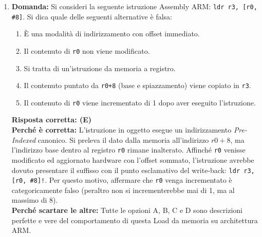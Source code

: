 \documentclass[12pt, a4paper]{article}
\begin{document}
\begin{enumerate}
\newpage
    
    \textbf{Risposta corretta: (D)} \\
    \textbf{Perché è corretta:} Per progettare una macchina a stati \textit{sincrona} (che aggiorna il suo stato interno solo a passi temporali rigidamente scanditi) è fisicamente obbligatorio utilizzare elementi sensibili unicamente al \textbf{fronte} del clock (Edge-triggered Flip-Flops). Un Latch D puro è invece trasparente "a livello": se il segnale di abilitazione resta alto, un feedback combinatorio farebbe ruzzolare i dati incontrollatamente nel circuito per tutta la durata del clock (race condition), rendendolo inidoneo per gestire macchine a stati complesse e sincronizzate. \\
    \textbf{Perché scartare le altre:} Essendo la (D) palesemente falsa, le altre (A e C) sono nozioni vere del mondo dell'elettronica (un Latch è effettivamente un circuito con due stati stabili ed è impiegato per memorizzare bit statici isolati).

    \item \textbf{Domanda:} Si consideri la seguente istruzione Assembly ARM: \texttt{ldr r3, [r0, \#8]}. Si dica quale delle seguenti alternative è falsa:
    \begin{enumerate}[label=(\Alph*)]
        \item È una modalità di indirizzamento con offset immediato.
        \item Il contenuto di \texttt{r0} non viene modificato.
        \item Si tratta di un'istruzione da memoria a registro.
        \item Il contenuto puntato da \texttt{r0+8} (base e spiazzamento) viene copiato in \texttt{r3}.
        \item Il contenuto di \texttt{r0} viene incrementato di 1 dopo aver eseguito l'istruzione.
    \end{enumerate}
    \textbf{Risposta corretta: (E)} \\
    \textbf{Perché è corretta:} L'istruzione in oggetto esegue un indirizzamento \textit{Pre-Indexed} canonico. Si preleva il dato dalla memoria all'indirizzo $r0 + 8$, ma l'indirizzo base dentro al registro \texttt{r0} rimane inalterato. Affinché \texttt{r0} venisse modificato ed aggiornato hardware con l'offset sommato, l'istruzione avrebbe dovuto presentare il suffisso con il punto esclamativo del write-back: \texttt{ldr r3, [r0, \#8]!}. Per questo motivo, affermare che \texttt{r0} venga incrementato è categoricamente falso (peraltro non si incrementerebbe mai di 1, ma al massimo di 8). \\
    \textbf{Perché scartare le altre:} Tutte le opzioni A, B, C e D sono descrizioni perfette e vere del comportamento di questa Load da memoria su architettura ARM.


\end{enumerate}
\end{document}
